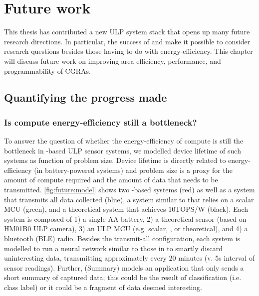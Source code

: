 \chapter{Future work}
\label{chapter:future}
This thesis has contributed a new ULP system stack that opens up many future research directions.
% 
In particular, the success of \snafu and \riptide make it possible to consider research questions besides those having to do with energy-efficiency.
% 
This chapter will discuss future work on improving area efficiency, performance, and programmability of CGRAs.

\section{Quantifying the progress made}

\figFutureModel
\subsection{Is compute energy-efficiency still a bottleneck?}
To answer the question of whether the energy-efficiency of compute is still the bottleneck in \riptide-based ULP sensor systems, we modelled device lifetime of such systems as function of problem size.
%
Device lifetime is directly related to energy-efficiency (in battery-powered systems) and problem size is a proxy for the amount of compute required and the amount of data that needs to be transmitted.
% 
\autoref{fig:future:model} shows two \riptide-based systems (red) as well as a system that transmits all data collected (blue), a system similar to \sonic that relies on a scalar MCU (green), and a theoretical system that achieves 10TOPS/W (black).
% 
Each system is composed of 1) a single AA battery, 2) a theoretical sensor (based on HM01B0 ULP camera), 3) an ULP MCU (e.g. scalar, \riptide, or theoretical), and 4) a bluetooth (BLE) radio.
% 
Besides the transmit-all configuration, each system is modelled to run a neural network similar to those in \sonic to smartly discard uninteresting data, transmitting approximately every $20$ minutes (v. 5s interval of sensor readings).
% 
Further, \riptide (Summary) models an application that only sends a short summary of captured data; this could be the result of classification (i.e. class label) or it could be a fragment of data deemed interesting.


